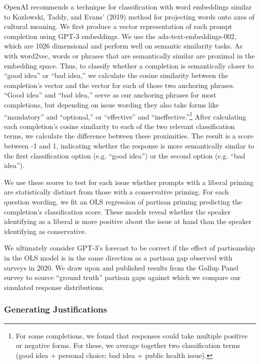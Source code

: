 \documentclass{article} %
\begin{document}
OpenAI recommends a technique for classification with word embeddings
similar to Kozlowski, Taddy, and Evans' (2019) method for projecting
words onto axes of cultural meaning. We first produce a vector
representation of each prompt completion using GPT-3 embeddings. We use
the ada-text-embeddings-002, which are 1026 dimensional and perform well
on semantic similarity tasks. As with word2vec, words or phrases that
are semantically similar are proximal in the embedding space. Thus, to
classify whether a completion is semantically closer to ``good idea'' or
``bad idea,'' we calculate the cosine similarity between the
completion's vector and the vector for each of those two anchoring
phrases. ``Good idea'' and ``bad idea,'' serve as our anchoring phrases
for most completions, but depending on issue wording they also take
forms like ``mandatory'' and ``optional,'' or ``effective'' and
``ineffective.''\footnote{For some completions, we found that responses
  could take multiple positive or negative forms. For these, we average
  together two classification terms (good idea + personal choice; bad
  idea + public health issue).} After calculating each completion's
cosine similarity to each of the two relevant classification terms, we
calculate the difference between these proximities. The result is a
score between -1 and 1, indicating whether the response is more
semantically similar to the first classification option (e.g. ``good
idea'') or the second option (e.g. ``bad idea'').

We use these scores to test for each issue whether prompts with a
liberal priming are statistically distinct from those with a
conservative priming. For each question wording, we fit an OLS
regression of partisan priming predicting the completion's
classification score. These models reveal whether the speaker
identifying as a liberal is more positive about the issue at hand than
the speaker identifying as conservative.

We ultimately consider GPT-3's forecast to be correct if the effect of
partisanship in the OLS model is in the same direction as a partisan gap
observed with surveys in 2020. We draw upon \citet{Gadarian2021-su} and
published results from the Gallup Panel survey
\parencite{McCarthy2023-xj} to source
``ground truth'' partisan gaps against which we compare our simulated
response distributions.

\subsubsection*{Generating Justifications}
\end{document}

